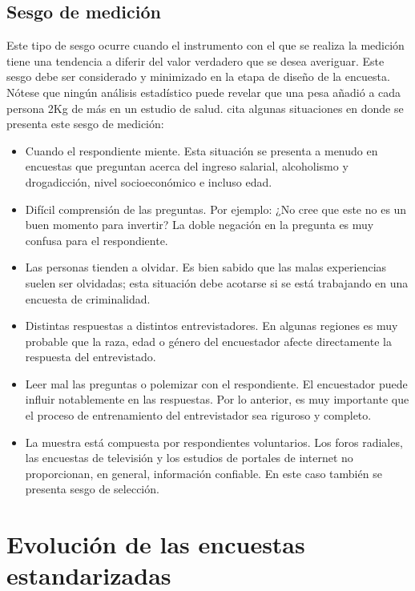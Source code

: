 \documentclass[
  12pt,
  spanish,
]{book}
\providecommand{\tightlist}{%
  \setlength{\itemsep}{0pt}\setlength{\parskip}{0pt}}
\begin{document}
\hypertarget{sesgo-de-mediciuxf3n}{%
\subsection{Sesgo de medición}\label{sesgo-de-mediciuxf3n}}

Este tipo de sesgo ocurre cuando el instrumento con el que se realiza la medición tiene una tendencia a diferir del valor verdadero que se desea averiguar. Este sesgo debe ser considerado y minimizado en la etapa de diseño de la encuesta. Nótese que ningún análisis estadístico puede revelar que una pesa añadió a cada persona 2Kg de más en un estudio de salud. \citet{Loh} cita algunas situaciones en donde se presenta este sesgo de medición:

\begin{itemize}
\tightlist
\item
  Cuando el respondiente miente. Esta situación se presenta a menudo en encuestas que preguntan acerca del ingreso salarial, alcoholismo y drogadicción, nivel socioeconómico e incluso edad.
\item
  Difícil comprensión de las preguntas. Por ejemplo: ¿No cree que este no es un buen momento para invertir? La doble negación en la pregunta es muy confusa para el respondiente.
\item
  Las personas tienden a olvidar. Es bien sabido que las malas experiencias suelen ser olvidadas; esta situación debe acotarse si se está trabajando en una encuesta de criminalidad.
\item
  Distintas respuestas a distintos entrevistadores. En algunas regiones es muy probable que la raza, edad o género del encuestador afecte directamente la respuesta del entrevistado.
\item
  Leer mal las preguntas o polemizar con el respondiente. El encuestador puede influir notablemente en las respuestas. Por lo anterior, es muy importante que el proceso de entrenamiento del entrevistador sea riguroso y completo.
\item
  La muestra está compuesta por respondientes voluntarios. Los foros radiales, las encuestas de televisión y los estudios de portales de internet no proporcionan, en general, información confiable. En este caso también se presenta sesgo de selección.
\end{itemize}

\hypertarget{evoluciuxf3n-de-las-encuestas-estandarizadas}{%
\section{Evolución de las encuestas estandarizadas}\label{evoluciuxf3n-de-las-encuestas-estandarizadas}}
\end{document}
